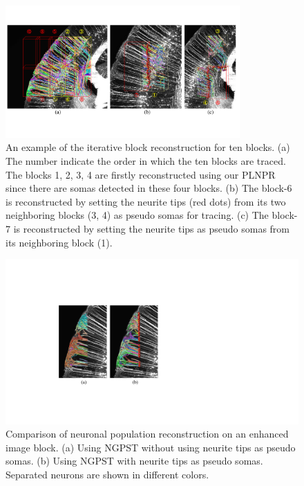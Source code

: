 \begin{figure}[t]
	\centering
	\includegraphics[width=0.8\textwidth]{./Illustrations/ultranpr_block_search2.pdf}
	\caption{An example of the iterative block reconstruction for ten blocks. (a) The number indicate the order in which the ten blocks are traced. The blocks 1, 2, 3, 4 are firstly reconstructed using our PLNPR since there are somas detected in these four blocks. (b) The block-6 is reconstructed by setting the neurite tips (red dots) from its two neighboring blocks (3, 4) as pseudo somas for tracing. (c) The block-7 is reconstructed by setting the neurite tips   as pseudo somas from its neighboring block (1). }
	\label{fig:blocksearch}
\end{figure}

\begin{figure}[t]
	\centering
	\includegraphics[width=1\columnwidth]{./Illustrations/ngpst_pseudosoma.pdf}
	\caption{Comparison of neuronal population reconstruction on an enhanced image block. (a) Using NGPST without using neurite tips as pseudo somas. 	(b) Using NGPST with neurite tips as pseudo somas. Separated neurons are shown in different colors.  }
	\label{fig:ngpst_pseudosoma}
\end{figure}

